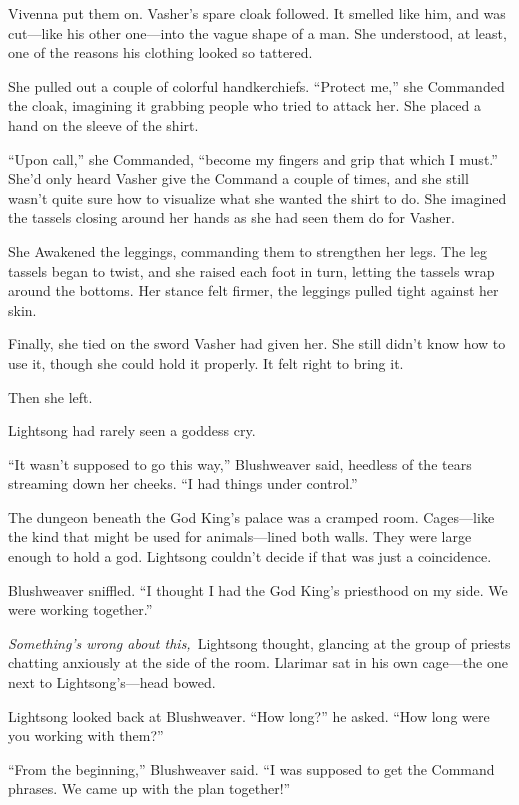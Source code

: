 Vivenna put them on. Vasher’s spare cloak followed. It smelled like him, and was cut—like his other one—into the vague shape of a man. She understood, at least, one of the reasons his clothing looked so tattered.

She pulled out a couple of colorful handkerchiefs. “Protect me,” she Commanded the cloak, imagining it grabbing people who tried to attack her. She placed a hand on the sleeve of the shirt.

“Upon call,” she Commanded, “become my fingers and grip that which I must.” She’d only heard Vasher give the Command a couple of times, and she still wasn’t quite sure how to visualize what she wanted the shirt to do. She imagined the tassels closing around her hands as she had seen them do for Vasher.

She Awakened the leggings, commanding them to strengthen her legs. The leg tassels began to twist, and she raised each foot in turn, letting the tassels wrap around the bottoms. Her stance felt firmer, the leggings pulled tight against her skin.

Finally, she tied on the sword Vasher had given her. She still didn’t know how to use it, though she could hold it properly. It felt right to bring it.

Then she left.

\orn

Lightsong had rarely seen a goddess cry.

“It wasn’t supposed to go this way,” Blushweaver said, heedless of the tears streaming down her cheeks. “I had things under control.”

The dungeon beneath the God King’s palace was a cramped room. Cages—like the kind that might be used for animals—lined both walls. They were large enough to hold a god. Lightsong couldn’t decide if that was just a coincidence.

Blushweaver sniffled. “I thought I had the God King’s priesthood on my side. We were working together.”

\textit{Something’s wrong about this,}~Lightsong thought, glancing at the group of priests chatting anxiously at the side of the room. Llarimar sat in his own cage—the one next to Lightsong’s—head bowed.

Lightsong looked back at Blushweaver. “How long?” he asked. “How long were you working with them?”

“From the beginning,” Blushweaver said. “I was supposed to get the Command phrases. We came up with the plan together!”

